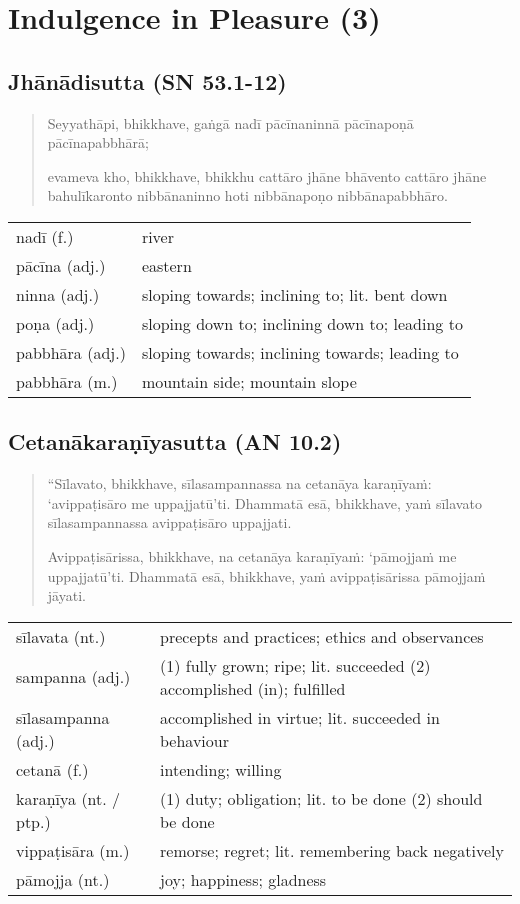 \documentclass[11pt,oneside]{memoir}
\begin{document}
\normalArrayStrech

\chapter{Indulgence in Pleasure (3)}
\label{sec:org9e01165}
\section{Jhānādisutta (SN 53.1-12)}
\label{sec:org63ad3b4}

\begin{quote}
Seyyathāpi, bhikkhave, gaṅgā nadī pācīnaninnā pācīnapoṇā pācīnapabbhārā;

evameva kho, bhikkhave, bhikkhu cattāro jhāne bhāvento cattāro jhāne
bahulīkaronto nibbānaninno hoti nibbānapoṇo nibbānapabbhāro.
\end{quote}

\begin{longtable}{L{\colOne} L{\colTwo}}
nadī (f.) & river\\[0pt]
pācīna (adj.) & eastern\\[0pt]
ninna (adj.) & sloping towards; inclining to; lit. bent down\\[0pt]
poṇa (adj.) & sloping down to; inclining down to; leading to\\[0pt]
pabbhāra (adj.) & sloping towards; inclining towards; leading to\\[0pt]
pabbhāra (m.) & mountain side; mountain slope\\[0pt]
\end{longtable}

\section{Cetanākaraṇīyasutta (AN 10.2)}
\label{sec:orgccd57a2}

\begin{quote}
“Sīlavato, bhikkhave, sīlasampannassa na cetanāya karaṇīyaṁ: ‘avippaṭisāro me
uppajjatū’ti. Dhammatā esā, bhikkhave, yaṁ sīlavato sīlasampannassa avippaṭisāro
uppajjati.

Avippaṭisārissa, bhikkhave, na cetanāya karaṇīyaṁ: ‘pāmojjaṁ me uppajjatū’ti.
Dhammatā esā, bhikkhave, yaṁ avippaṭisārissa pāmojjaṁ jāyati.
\end{quote}

\begin{longtable}{L{\colOne} L{\colTwo}}
sīlavata (nt.) & precepts and practices; ethics and observances\\[0pt]
sampanna (adj.) & (1) fully grown; ripe; lit. succeeded (2) accomplished (in); fulfilled\\[0pt]
sīlasampanna (adj.) & accomplished in virtue; lit. succeeded in behaviour\\[0pt]
cetanā (f.) & intending; willing\\[0pt]
karaṇīya (nt. / ptp.) & (1) duty; obligation; lit. to be done (2) should be done\\[0pt]
vippaṭisāra (m.) & remorse; regret; lit. remembering back negatively\\[0pt]
pāmojja (nt.) & joy; happiness; gladness\\[0pt]
\end{longtable}
\end{document}
